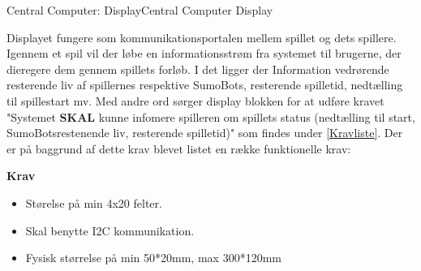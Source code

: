 
\begin{PartBlokDescription}{Central Computer: Display}{Central Computer Display}
\end{PartBlokDescription}

Displayet fungere som kommunikationsportalen mellem spillet og dets spillere. Igennem et spil vil der løbe en informationsstrøm fra systemet til brugerne, der dieregere dem gennem spillets forløb. I det ligger der Information vedrørende resterende liv af spillernes respektive SumoBots, resterende spilletid, nedtælling til spillestart mv. Med andre ord sørger display blokken for at udføre kravet "Systemet \textbf{SKAL} kunne infomere spilleren om spillets status (nedtælling til start, SumoBotsrestenende liv, resterende spilletid)" som findes under \ref{Kravliste}. Der er på baggrund af dette krav blevet listet en række funktionelle krav:

\textbf{Krav}\label{Display_funktionelle_krav}
\begin{itemize}
\item Størelse på min 4x20 felter.
\item Skal benytte I2C kommunikation.
\item Fysisk størrelse på min 50*20mm, max 300*120mm

\end{itemize}